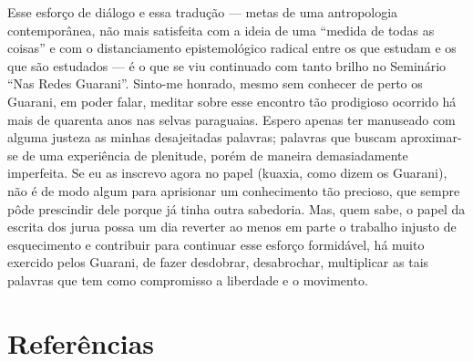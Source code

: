 Esse esforço de diálogo e essa tradução — metas de uma antropologia
contemporânea, não mais satisfeita com a ideia de uma ``medida de todas
as coisas'' e com o distanciamento epistemológico radical entre os que
estudam e os que são estudados — é o que se viu continuado com tanto
brilho no Seminário ``Nas Redes Guarani''. Sinto-me honrado, mesmo sem
conhecer de perto os Guarani, em poder falar, meditar sobre esse
encontro tão prodigioso ocorrido há mais de quarenta anos nas selvas
paraguaias. Espero apenas ter manuseado com alguma justeza as minhas
desajeitadas palavras; palavras que buscam aproximar-se de uma
experiência de plenitude, porém de maneira demasiadamente imperfeita.
Se eu as inscrevo agora no papel (kuaxia, como dizem os Guarani), não é
de modo algum para aprisionar um conhecimento tão precioso, que sempre
pôde prescindir dele porque já tinha outra sabedoria. Mas, quem sabe, o
papel da escrita dos jurua possa um dia reverter ao menos em parte o
trabalho injusto de esquecimento e contribuir para continuar esse
esforço formidável, há muito exercido pelos Guarani, de fazer
desdobrar, desabrochar, multiplicar as tais palavras que tem como
compromisso a liberdade e o movimento.

\section{Referências}

